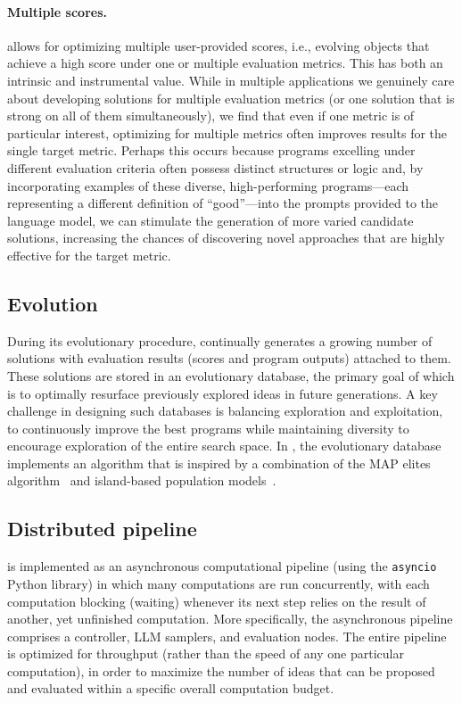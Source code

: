 \paragraph{Multiple scores.}
\method allows for optimizing multiple user-provided scores, i.e., evolving objects that achieve a high score under one or multiple evaluation metrics.
This has both an intrinsic and instrumental value. While in multiple applications we genuinely care about developing solutions for multiple evaluation metrics (or one solution that is strong on all of them simultaneously), we find that even if one metric is of particular interest, optimizing for multiple metrics often improves results for the single target metric.
Perhaps this occurs because programs excelling under different evaluation criteria often possess distinct structures or logic and, by incorporating examples of these diverse, high-performing programs---each representing a different definition of ``good''---into the prompts provided to the language model, we can stimulate the generation of more varied candidate solutions, increasing the chances of discovering novel approaches that are highly effective for the target metric.


\subsection{Evolution}
\label{subsec:evolution}

During its evolutionary procedure, \method continually generates a growing number of solutions with evaluation results (scores and program outputs) attached to them.
These solutions are stored in an evolutionary database, the primary goal of which is to optimally resurface previously explored ideas in future generations.
A key challenge in designing such databases is balancing exploration and exploitation, to continuously improve the best programs while maintaining diversity to encourage exploration of the entire search space.
In \method, the evolutionary database implements an algorithm that is inspired by a combination of the MAP elites algorithm~\cite{mouret2015illuminating} and island-based population models~\cite{tanese1989distributed, paredes2023mathematical}.


\subsection{Distributed pipeline}
\label{subsec:pipeline}

\method is implemented as an asynchronous computational pipeline (using the \texttt{asyncio} Python library) in which many computations are run concurrently, with each computation blocking (waiting) whenever its next step relies on the result of another, yet unfinished computation.
More specifically, the asynchronous pipeline comprises a controller, LLM samplers, and evaluation nodes.
The entire pipeline is optimized for throughput (rather than the speed of any one particular computation), in order to maximize the number of ideas that can be proposed and evaluated within a specific overall computation budget.
